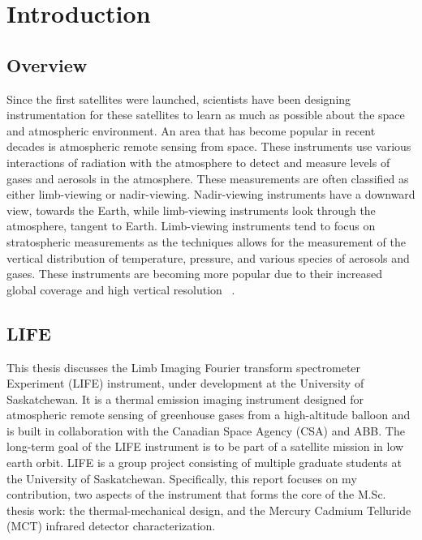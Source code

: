 \chapter{Introduction}

\section{Overview}
Since the first satellites were launched, scientists have been designing instrumentation for these satellites to learn as much as possible about the space and atmospheric environment. An area that has become popular in recent decades is atmospheric remote sensing from space. These instruments use various interactions of radiation with the atmosphere to detect and measure levels of gases and aerosols in the atmosphere. These measurements are often classified as either limb-viewing or nadir-viewing. Nadir-viewing instruments have a downward view, towards the Earth, while limb-viewing instruments look through the atmosphere, tangent to Earth. Limb-viewing instruments tend to focus on stratospheric measurements as the techniques allows for the measurement of the vertical distribution of temperature, pressure, and various species of aerosols and gases. These instruments are becoming more popular due to their increased global coverage and high vertical resolution ~\citep{SPARC}.

\section{LIFE}
This thesis discusses the Limb Imaging Fourier transform spectrometer Experiment (LIFE) instrument, under development at the University of Saskatchewan. It is a thermal emission imaging instrument designed for atmospheric remote sensing of greenhouse gases from a high-altitude balloon and is built in collaboration with the Canadian Space Agency (CSA) and ABB. The long-term goal of the LIFE instrument is to be part of a satellite mission in low earth orbit. LIFE is a group project consisting of multiple graduate students at the University of Saskatchewan. Specifically, this report focuses on my contribution, two aspects of the instrument that forms the core of the M.Sc. thesis work: the thermal-mechanical design, and the Mercury Cadmium Telluride (MCT) infrared detector characterization. 

